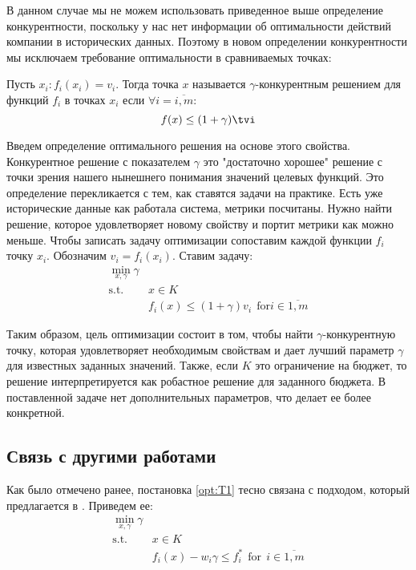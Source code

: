 В данном случае мы не можем использовать приведенное выше определение конкурентности, поскольку у нас нет информации об оптимальности действий компании в исторических данных. Поэтому в новом определении конкурентности мы исключаем требование оптимальности в сравниваемых точках:

\begin{definition}\label{def:gamma_competitive}
    Пусть $x_i: f_i(x_i) = v_i$. Тогда точка $x$ называется $\gamma$-конкурентным решением для функций  $f_i$ в точках $x_i$ если $\forall i = \overline{i,m}$:
    $$
    f(x) \leq (1 + \gamma) \tvi
    $$
\end{definition}

Введем определение оптимального решения на основе этого свойства. Конкурентное решение с показателем $\gamma$ это "достаточно хорошее" решение с точки зрения нашего нынешнего понимания значений целевых функций. Это определение перекликается с тем, как ставятся задачи на практике. Есть уже исторические данные как работала система, метрики посчитаны. Нужно найти решение, которое удовлетворяет новому свойству и портит метрики как можно меньше. Чтобы записать задачу оптимизации сопоставим каждой функции $f_i$ точку $x_i$. Обозначим $v_i = f_i(x_i)$. Ставим задачу:
\begin{align*}
    \min_{x, \gamma} \gamma & \tag{$T_1$}\label{opt:T1} \\    
    \text{s.t. } & x \in K \\
                 &f_i(x) \leq (1 + \gamma) v_i ~~ \text{for} i\in\overline{1, m}
\end{align*}

Таким образом, цель оптимизации состоит в том, чтобы найти $\gamma$-конкурентную точку, которая удовлетворяет необходимым свойствам и дает лучший параметр $\gamma$ для известных заданных значений. Также, если $K$ это ограничение на бюджет, то решение интерпретируется как робастное решение для заданного бюджета. В поставленной задаче нет дополнительных параметров, что делает ее более конкретной.

\subsection{Связь с другими работами}
Как было отмечено ранее, постановка \ref{opt:T1} тесно связана с подходом, который предлагается в \cite{gembicki1975approach}. Приведем ее:
\begin{align*}
    \min_{x, \gamma} \gamma & \tag{$T_1$}\label{opt:T1} \\    
    \text{s.t. } & x \in K \\
                 &f_i(x) - w_i \gamma \leq f_i^* ~~ \text{for}~~ i\in\overline{1, m}
\end{align*}

